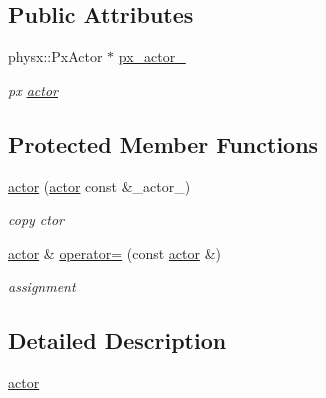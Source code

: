 \subsection*{Public Attributes}
\begin{DoxyCompactItemize}
\item 
physx::PxActor $\ast$ \hyperlink{classnebula_1_1content_1_1actor_1_1physics_1_1actor_a6085a7feb406d34f35a683e87b728fd0}{px\_\-actor\_\-}
\begin{DoxyCompactList}\small\item\em px \hyperlink{classnebula_1_1content_1_1actor_1_1physics_1_1actor}{actor} \item\end{DoxyCompactList}\end{DoxyCompactItemize}
\subsection*{Protected Member Functions}
\begin{DoxyCompactItemize}
\item 
\hyperlink{classnebula_1_1content_1_1actor_1_1physics_1_1actor_a82742d9479e4c56498e5dbff6e7c5929}{actor} (\hyperlink{classnebula_1_1content_1_1actor_1_1physics_1_1actor}{actor} const \&\_\-actor\_\-)
\begin{DoxyCompactList}\small\item\em copy ctor \item\end{DoxyCompactList}\item 
\hyperlink{classnebula_1_1content_1_1actor_1_1physics_1_1actor}{actor} \& \hyperlink{classnebula_1_1content_1_1actor_1_1physics_1_1actor_abdcf4fcfdf017e71cea08a8c0341a4c8}{operator=} (const \hyperlink{classnebula_1_1content_1_1actor_1_1physics_1_1actor}{actor} \&)
\begin{DoxyCompactList}\small\item\em assignment \item\end{DoxyCompactList}\end{DoxyCompactItemize}


\subsection{Detailed Description}
\hyperlink{classnebula_1_1content_1_1actor_1_1physics_1_1actor}{actor} 

